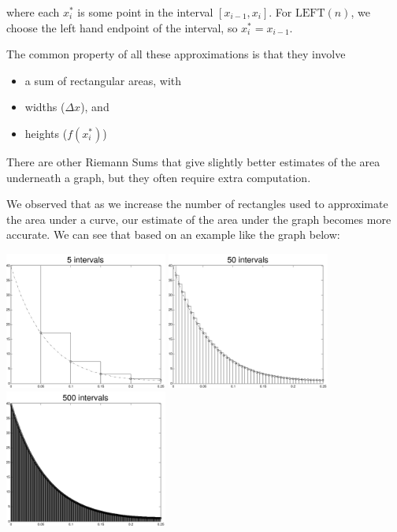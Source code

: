 where each $x_{i}^{*}$ is some point in the interval $[x_{i-1},
x_{i}]$.  For $\mbox{LEFT}(n)$, we choose the left hand endpoint of the
interval, so $x_{i}^* = x_{i-1}$.

\newpage

The common property of all these
approximations is that they involve
\begin{itemize}
\item a sum of rectangular areas, with \\[1ex]
\item widths ($\Delta x$), and \\[1ex]
\item heights ($f(x_i^*)$)
\end{itemize}

There are other Riemann Sums that give slightly better estimates of
the area underneath a graph, but they often require extra computation.

\newpage


We observed that as we increase the number of rectangles used to
approximate the area under a curve, our estimate of the area under the
graph becomes more accurate.  We can see that based on an example like
the graph below:

\begin{center}
\includegraphics[height=4.5cm]{graphics/notes_04_f_lhr_5_intervals}
\includegraphics[height=4.5cm]{graphics/notes_04_f_lhr_50_intervals}
\includegraphics[height=4.5cm]{graphics/notes_04_f_lhr_500_intervals}
\end{center}

